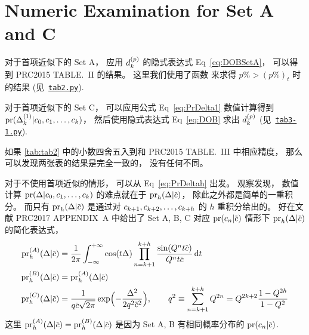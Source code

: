 
\section{Numeric Examination for Set A and C}
对于首项近似下的 Set A，
应用 $d_k^{(p)}$ 的隐式表达式 Eq~\eqref{eq:DOBSetA}，
可以得到 PRC2015 TABLE.~II 的结果。
这里我们使用了函数 
来求得 $p\%>(p\%)_t$ 时的结果
(见~\href{https://github.com/Dou-Meishi/bayesforerror/blob/master/code/tab2.py}{\texttt{tab2.py}}).

对于首项近似下的 Set C，
可以应用公式 Eq~\eqref{eq:PrDelta1} 数值计算得到 $\textrm{pr}(\Delta_k^{(1)}|
c_0,c_1,\ldots,c_k)$，
然后使用隐式表达式 Eq~\eqref{eq:DOB} 求出 $d_k^{(p)}$
(见~\href{https://github.com/Dou-Meishi/bayesforerror/blob/master/code/tab3-1.py}{\texttt{tab3-1.py}}).

如果 \autoref{tab:tab2} 中的小数四舍五入到和 PRC2015 TABLE.~III 中相应精度，
那么可以发现两张表的结果是完全一致的，
没有任何不同。

对于不使用首项近似的情形，
可以从 Eq~\eqref{eq:PrDeltah} 出发。
观察发现，
数值计算 $\textrm{pr}(\Delta|c_0,c_1,\ldots,c_k)$ 的难点就在于
$\dmspr_h(\Delta|\dmscbar)$，
除此之外都是简单的一重积分。
而只有 $\dmspr_h(\Delta|\dmscbar)$ 是通过对 $c_{k+1},c_{k+2},\ldots,c_{k+h}$ 的 $h$ 重积分给出的。
好在文献 PRC2017 APPENDIX~A 中给出了 Set A, B, C 对应 $\dmspr(c_n|\dmscbar)$
情形下 $\dmspr_h(\Delta|\dmscbar)$ 的简化表达式，
\begin{equation}
  \label{eq:PrhABC}
  \begin{aligned}
    \dmspr_h^{(A)}(\Delta|\dmscbar) &=
    \frac{1}{2\pi}\int_{-\infty}^{+\infty}
    \cos(t\Delta) \prod_{n=k+1}^{k+h}
    \frac{\sin( Q^nt\dmscbar)}{ Q^nt\dmscbar}\dmsdif t\\
    \dmspr_h^{(B)}(\Delta|\dmscbar) &= \dmspr_h^{(A)}(\Delta|\dmscbar) \\
    \dmspr_h^{(C)}(\Delta|\dmscbar) &=
    \frac{1}{q\dmscbar\sqrt{2\pi}}\exp\Bigl(- \frac{
        \Delta^2}{2q^2\dmscbar^2}\Bigr),
    \qquad q^2\equiv\sum_{n=k+1}^{k+h}Q^{2n}
    = Q^{2k+2} \frac{1-Q^{2h}}{1-Q^2}
  \end{aligned}
\end{equation}
这里 $\dmspr_h^{(A)}(\Delta|\dmscbar)=\dmspr_h^{(B)}(\Delta|\dmscbar)$
是因为 Set A, B 有相同概率分布的 $\dmspr(c_n|\dmscbar)$.

